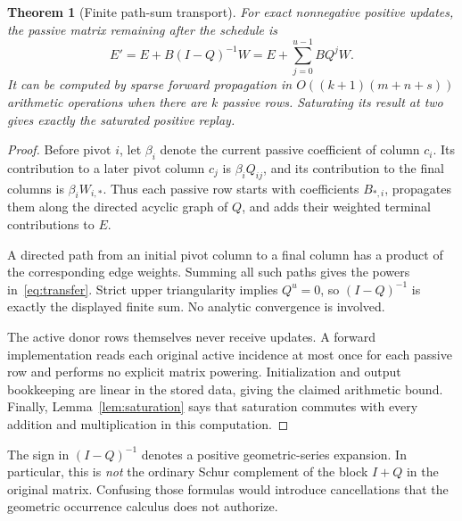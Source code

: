 \documentclass[11pt]{article}
\newtheorem{theorem}{Theorem}[section]
\theoremstyle{definition}\newtheorem{definition}[theorem]{Definition}
\theoremstyle{remark}\newtheorem{remark}[theorem]{Remark}
\begin{document}
\begin{theorem}[Finite path-sum transport]
\label{thm:transport}
For exact nonnegative positive updates, the passive matrix remaining after the schedule is
\begin{equation}
 E'=E+B(I-Q)^{-1}W
    =E+\sum_{j=0}^{u-1}BQ^jW.
 \label{eq:transfer}
\end{equation}
It can be computed by sparse forward propagation in $O((k+1)(m+n+s))$ arithmetic operations when there are $k$ passive rows. Saturating its result at two gives exactly the saturated positive replay.
\end{theorem}
\begin{proof}
Before pivot $i$, let $\beta_i$ denote the current passive coefficient of column $c_i$. Its contribution to a later pivot column $c_j$ is $\beta_iQ_{ij}$, and its contribution to the final columns is $\beta_iW_{i,*}$. Thus each passive row starts with coefficients $B_{*,i}$, propagates them along the directed acyclic graph of $Q$, and adds their weighted terminal contributions to $E$.

A directed path from an initial pivot column to a final column has a product of the corresponding edge weights. Summing all such paths gives the powers in~\eqref{eq:transfer}. Strict upper triangularity implies $Q^u=0$, so $(I-Q)^{-1}$ is exactly the displayed finite sum. No analytic convergence is involved.

The active donor rows themselves never receive updates. A forward implementation reads each original active incidence at most once for each passive row and performs no explicit matrix powering. Initialization and output bookkeeping are linear in the stored data, giving the claimed arithmetic bound. Finally, Lemma~\ref{lem:saturation} says that saturation commutes with every addition and multiplication in this computation.
\end{proof}

The sign in $(I-Q)^{-1}$ denotes a positive geometric-series expansion. In particular, this is \emph{not} the ordinary Schur complement of the block $I+Q$ in the original matrix. Confusing those formulas would introduce cancellations that the geometric occurrence calculus does not authorize.
\end{document}
